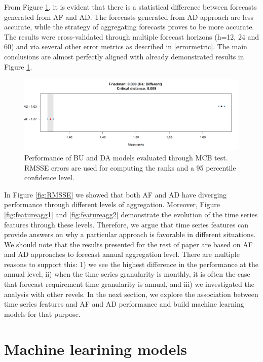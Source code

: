 \documentclass[]{elsarticle} %
\begin{document}
From Figure \ref{fig:MCB}, it is evident that there is a statistical
difference between forecasts generated from AF and AD. The forecasts
generated from AD approach are less accurate, while the strategy of
aggregating forecasts proves to be more accurate. The results were
cross-validated through multiple forecast horizons (h=12, 24 and 60) and
via several other error metrics as described in \ref{errormetric}. The
main conclusions are almost perfectly aligned with already demonstrated
results in Figure \ref{fig:MCB}.

\begin{figure}[H]

{\centering \includegraphics[width=1\linewidth]{img/300dpi/Fig_MCB} 

}

\caption{Performance of BU and DA models evaluated through MCB test. RMSSE errors are used for computing the ranks and a 95 percentile confidence level.}\label{fig:MCB}
\end{figure}

In Figure \ref{fig:RMSSE} we showed that both AF and AD have diverging
performance through different levels of aggregation. Moreover, Figure
\ref{fig:featureagg1} and \ref{fig:featureagg2} demonstrate the
evolution of the time series features through these levels. Therefore,
we argue that time series features can provide answers on why a
particular approach is favorable in different situations. We should note
that the results presented for the rest of paper are based on AF and AD
approaches to forecast annual aggregation level. There are multiple
reasons to support this: 1) we see the highest difference in the
performance at the annual level, ii) when the time series granularity is
monthly, it is often the case that forecast requirement time granularity
is annual, and iii) we investigated the analysis with other revels. In
the next section, we explore the association between time series
features and AF and AD performance and build machine learning models for
that purpose.

\hypertarget{ml}{%
\section{Machine learining models}\label{ml}}
\end{document}
